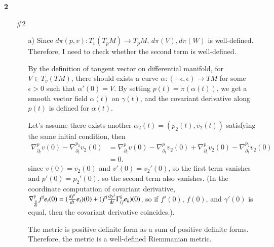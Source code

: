 \documentclass[a4paper, 12pt]{article}
\theoremstyle{Mydefinition}
\theoremstyle{Mytheorem}
\begin{document}
\noindent\textbf{2}
\begin{enumerate}
    \item[\#2]
    \begin{enumerate}
        \item[a)] Since $d\pi(p,v):T_v(T_pM)\rightarrow T_p M$, $d\pi(V),d\pi(W)$ is well-defined. Therefore, I need to check whether the second term is well-defined. 
        
        By the definition of tangent vector on differential manifold, for $V\in T_v(TM)$, there should exists a curve $\alpha:(-\epsilon, \epsilon)\rightarrow TM$ for some $\epsilon>0$ such that $\alpha'(0) = V$. By setting $p(t) = \pi(\alpha(t))$, we get a smooth vector field $\alpha(t)$ on $\gamma(t)$, and the covariant derivative along $p(t)$ is defined for $\alpha(t)$.
        
        Let's assume there exists another $\alpha_2(t) = (p_2(t), v_2(t))$ satisfying the same initial condition, then
        \begin{equation}
        \begin{split}
            \nabla^p_{\partial_t}v(0)-\nabla^{p_2}_{\partial_t}v_2(0) &= \nabla^p_{\partial_t}v(0)-\nabla^p_{\partial_t}v_2(0) + \nabla^p_{\partial_t}v_2(0) - \nabla^{p_2}_{\partial_t}v_2(0)\\
            &=0.
        \end{split}
        \end{equation}
        since $v(0) = v_2(0)$ and $v'(0) = v_2'(0)$, so the first term vanishes and $p'(0) = p_2'(0)$, so the second term also vanishes. (In the coordinate computation of covariant derivative, $\nabla^\gamma_{\pdv{t}} f^i e_i(0) = (\frac{df^i}{dt} e_i)(0) + (f^i \dv{\gamma^j}{t}\Gamma_{ij}^k e_k)(0)$, so if $f'(0)$, $f(0)$, and $\gamma'(0)$ is equal, then the covariant derivative coincides.).
        
        The metric is positive definite form as a sum of positive definite forms. Therefore, the metric is a well-defined Riemmanian metric.
        

\end{enumerate}
\end{enumerate}
\end{document}
